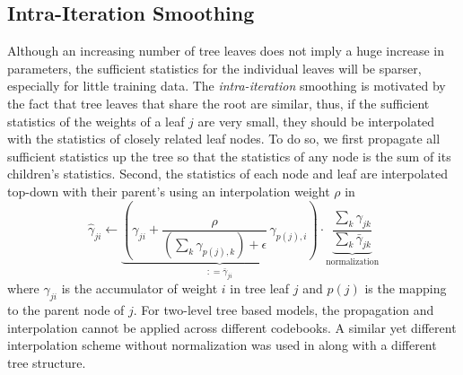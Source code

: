 \documentclass{article}
\begin{document}
\subsection{Intra-Iteration Smoothing}
Although an increasing number of tree leaves does not imply a huge increase in
parameters, the sufficient statistics for the individual leaves will be
sparser, especially for little training data.
The {\em intra-iteration} smoothing is motivated by the fact that tree leaves
that share the root are similar, thus, if the sufficient statistics of the
weights of a leaf $j$ are very small, they should be interpolated with the 
statistics of closely related leaf nodes.
To do so, we first propagate all sufficient statistics up the tree so that the
statistics of any node is the sum of its children's statistics.
Second, the statistics of each node and leaf are interpolated top-down with 
their parent's using an interpolation weight $\rho$ in
\begin{equation} \label{eq:intra}
\hat\gamma_{ji} \leftarrow 
  \underbrace{\left(\gamma_{ji} + \frac{\rho}{\left( \sum_k \gamma_{p(j),k} \right) + \epsilon} \, \gamma_{p(j),i}\right)}_{\mathrel{\mathop{:}}= \bar\gamma_{ji}}
  \cdot 
  \underbrace{\frac{\sum_k \gamma_{jk}}{\sum_k \bar\gamma_{jk}}}_\text{normalization}
\end{equation}
where $\gamma_{ji}$ is the accumulator of weight $i$ in tree leaf $j$
and $p(j)$ is the mapping to the parent node of $j$.
%
For two-level tree based models, the propagation and interpolation cannot
be applied across different codebooks. 
%
A similar yet different interpolation scheme without normalization was used in 
\cite{schukattalamazzini1994srf,schukattalamazzini1995as} along with a different
tree structure.

\end{document}
